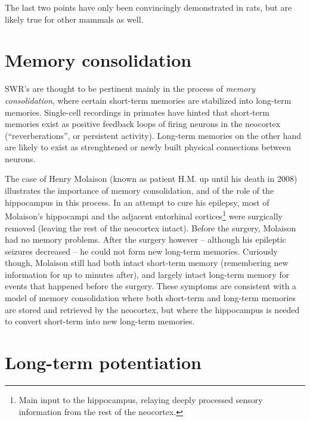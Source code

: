 The last two points have only been convincingly demonstrated in rats, but are likely true for other mammals as well.




\section{Memory consolidation}

SWR's are thought to be pertinent mainly in the process of \emph{memory consolidation}, where certain short-term memories are stabilized into long-term memories. Single-cell recordings in primates have hinted that short-term memories exist as positive feedback loops of firing neurons in the neocortex (``reverberations'', or persistent activity). Long-term memories on the other hand are likely to exist as strenghtened or newly built physical connections between neurons. \cite{Kandel2013,Bear2015}

The case of Henry Molaison (known as patient H.M. up until his death in 2008) illustrates the importance of memory consolidation, and of the role of the hippocampus in this process. In an attempt to cure his epilepsy, most of Molaison's hippocampi and the adjacent entorhinal cortices\footnote{Main input to the hippocampus, relaying deeply processed sensory information from the rest of the neocortex.} were surgically removed (leaving the rest of the neocortex intact). Before the surgery, Molaison had no memory problems. After the surgery however -- although his epileptic seizures decreased -- he could not form new long-term memories.\footnotemark{} Curiously though, Molaison still had both intact short-term memory (remembering new information for up to minutes after), and largely intact long-term memory for events that happened before the surgery. These symptoms are consistent with a model of memory consolidation where both short-term and long-term memories are stored and retrieved by the neocortex, but where the hippocampus is needed to convert short-term into new long-term memories. \cite{Kandel2013}





\section{Long-term potentiation}





